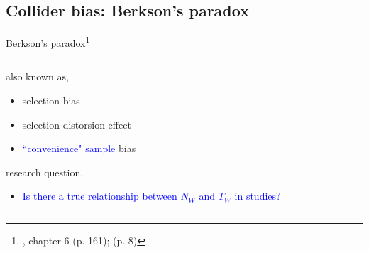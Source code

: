 %
%
\subsection{Collider bias: Berkson's paradox}
%
%
\begin{frame}[t, negative, label=sa]
	\subsectionpage
\end{frame}
%
%
\begin{frame}
	{Berkson's paradox\footnote{\citet{McElreath_2020}, chapter 6 (p. 161); \citet{Cinelli_et_al_2021} (p. 8)}}
	\begin{columns}
		\begin{column}{0.5\textwidth}
			also known as,
			\begin{itemize}
				\item selection bias
				\item selection-distorsion effect
				\item \textcolor{blue}{``convenience" sample} bias
			\end{itemize}
			
			research question, 
			\begin{itemize}
				\item \textcolor{blue}{Is there a true relationship between $N_{W}$ and $T_{W}$ in studies?}
			\end{itemize}
			

\end{column}
\end{columns}
\end{frame}
